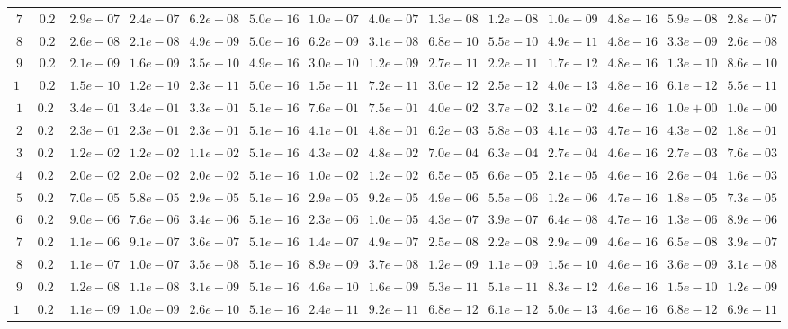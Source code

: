\begin{tabular}{cccccccccccccc}
$7$ & $0.2$ & $2.9e-07$ & $2.4e-07$ & $6.2e-08$ & $5.0e-16$ & $1.0e-07$ & $4.0e-07$ & $1.3e-08$ & $1.2e-08$ & $1.0e-09$ & $4.8e-16$ & $5.9e-08$ & $2.8e-07$\\
$8$ & $0.2$ & $2.6e-08$ & $2.1e-08$ & $4.9e-09$ & $5.0e-16$ & $6.2e-09$ & $3.1e-08$ & $6.8e-10$ & $5.5e-10$ & $4.9e-11$ & $4.8e-16$ & $3.3e-09$ & $2.6e-08$\\
$9$ & $0.2$ & $2.1e-09$ & $1.6e-09$ & $3.5e-10$ & $4.9e-16$ & $3.0e-10$ & $1.2e-09$ & $2.7e-11$ & $2.2e-11$ & $1.7e-12$ & $4.8e-16$ & $1.3e-10$ & $8.6e-10$\\
$10$ & $0.2$ & $1.5e-10$ & $1.2e-10$ & $2.3e-11$ & $5.0e-16$ & $1.5e-11$ & $7.2e-11$ & $3.0e-12$ & $2.5e-12$ & $4.0e-13$ & $4.8e-16$ & $6.1e-12$ & $5.5e-11$\\
$1$ & $0.25$ & $3.4e-01$ & $3.4e-01$ & $3.3e-01$ & $5.1e-16$ & $7.6e-01$ & $7.5e-01$ & $4.0e-02$ & $3.7e-02$ & $3.1e-02$ & $4.6e-16$ & $1.0e+00$ & $1.0e+00$\\
$2$ & $0.25$ & $2.3e-01$ & $2.3e-01$ & $2.3e-01$ & $5.1e-16$ & $4.1e-01$ & $4.8e-01$ & $6.2e-03$ & $5.8e-03$ & $4.1e-03$ & $4.7e-16$ & $4.3e-02$ & $1.8e-01$\\
$3$ & $0.25$ & $1.2e-02$ & $1.2e-02$ & $1.1e-02$ & $5.1e-16$ & $4.3e-02$ & $4.8e-02$ & $7.0e-04$ & $6.3e-04$ & $2.7e-04$ & $4.6e-16$ & $2.7e-03$ & $7.6e-03$\\
$4$ & $0.25$ & $2.0e-02$ & $2.0e-02$ & $2.0e-02$ & $5.1e-16$ & $1.0e-02$ & $1.2e-02$ & $6.5e-05$ & $6.6e-05$ & $2.1e-05$ & $4.6e-16$ & $2.6e-04$ & $1.6e-03$\\
$5$ & $0.25$ & $7.0e-05$ & $5.8e-05$ & $2.9e-05$ & $5.1e-16$ & $2.9e-05$ & $9.2e-05$ & $4.9e-06$ & $5.5e-06$ & $1.2e-06$ & $4.7e-16$ & $1.8e-05$ & $7.3e-05$\\
$6$ & $0.25$ & $9.0e-06$ & $7.6e-06$ & $3.4e-06$ & $5.1e-16$ & $2.3e-06$ & $1.0e-05$ & $4.3e-07$ & $3.9e-07$ & $6.4e-08$ & $4.7e-16$ & $1.3e-06$ & $8.9e-06$\\
$7$ & $0.25$ & $1.1e-06$ & $9.1e-07$ & $3.6e-07$ & $5.1e-16$ & $1.4e-07$ & $4.9e-07$ & $2.5e-08$ & $2.2e-08$ & $2.9e-09$ & $4.6e-16$ & $6.5e-08$ & $3.9e-07$\\
$8$ & $0.25$ & $1.1e-07$ & $1.0e-07$ & $3.5e-08$ & $5.1e-16$ & $8.9e-09$ & $3.7e-08$ & $1.2e-09$ & $1.1e-09$ & $1.5e-10$ & $4.6e-16$ & $3.6e-09$ & $3.1e-08$\\
$9$ & $0.25$ & $1.2e-08$ & $1.1e-08$ & $3.1e-09$ & $5.1e-16$ & $4.6e-10$ & $1.6e-09$ & $5.3e-11$ & $5.1e-11$ & $8.3e-12$ & $4.6e-16$ & $1.5e-10$ & $1.2e-09$\\
$10$ & $0.25$ & $1.1e-09$ & $1.0e-09$ & $2.6e-10$ & $5.1e-16$ & $2.4e-11$ & $9.2e-11$ & $6.8e-12$ & $6.1e-12$ & $5.0e-13$ & $4.6e-16$ & $6.8e-12$ & $6.9e-11$\\

\end{tabular}
